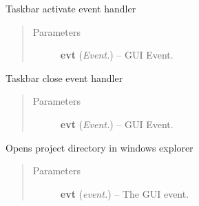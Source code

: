 \documentclass[letterpaper,10pt,english]{sphinxmanual}
\begin{document}
\begin{fulllineitems}
\begin{fulllineitems}
\end{fulllineitems}


\begin{fulllineitems}
\label{api:wos.GUI.OnTaskBarActivate}
Taskbar activate event handler
\begin{quote}\begin{description}
\item[{Parameters}] \leavevmode
\textbf{evt} (\emph{Event.}) -- GUI Event.

\end{description}\end{quote}

\end{fulllineitems}


\begin{fulllineitems}
\label{api:wos.GUI.OnTaskBarClose}
Taskbar close event handler
\begin{quote}\begin{description}
\item[{Parameters}] \leavevmode
\textbf{evt} (\emph{Event.}) -- GUI Event.

\end{description}\end{quote}

\end{fulllineitems}


\begin{fulllineitems}
\label{api:wos.GUI.OpenProjectDir}
Opens project directory in windows explorer
\begin{quote}\begin{description}
\item[{Parameters}] \leavevmode
\textbf{evt} (\emph{event.}) -- The GUI event.

\end{description}\end{quote}

\end{fulllineitems}



\end{fulllineitems}
\end{document}
